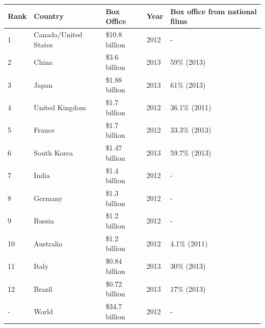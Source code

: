 \documentclass{article}
\begin{document}
\begin{tabular}{lllll}
\toprule
Rank & Country & Box Office & Year & Box office from national films \\
\midrule
1 & Canada/United States & \$10.8 billion & 2012 & - \\
2 & China & \$3.6 billion & 2013 & 59\% (2013) \\
3 & Japan & \$1.88 billion & 2013 & 61\% (2013) \\
4 & United Kingdom & \$1.7 billion & 2012 & 36.1\% (2011) \\
5 & France & \$1.7 billion & 2012 & 33.3\% (2013) \\
6 & South Korea & \$1.47 billion & 2013 & 59.7\% (2013) \\
7 & India & \$1.4 billion & 2012 & - \\
8 & Germany & \$1.3 billion & 2012 & - \\
9 & Russia & \$1.2 billion & 2012 & - \\
10 & Australia & \$1.2 billion & 2012 & 4.1\% (2011) \\
11 & Italy & \$0.84 billion & 2013 & 30\% (2013) \\
12 & Brazil & \$0.72 billion & 2013 & 17\% (2013) \\
- & World & \$34.7 billion & 2012 & - \\
\bottomrule
\end{tabular}
\end{document}
